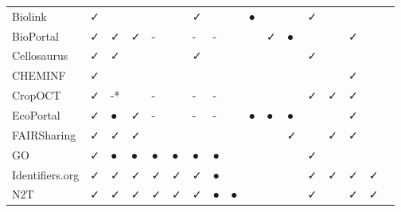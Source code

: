 \begin{table}
\begin{tabular}{lllllllllllllllll}
        Biolink &              ✓ &          &       &            &            &        ✓ &                &               &       ● &         &         &                          ✓ &        &                 &          &        \\
      BioPortal &              ✓ &        ✓ &     ✓ &          - &            &        - &              - &               &         &       ✓ &       ● &                            &        &               ✓ &          &        \\
    Cellosaurus &              ✓ &        ✓ &       &            &            &        ✓ &                &               &         &         &         &                          ✓ &        &                 &          &        \\
        CHEMINF &              ✓ &          &       &            &            &          &                &               &         &         &         &                            &        &               ✓ &          &        \\
        CropOCT &              ✓ &       -* &       &          - &            &        - &              - &               &         &         &         &                          ✓ &      ✓ &               ✓ &          &        \\
      EcoPortal &              ✓ &        ● &     ✓ &          - &            &        - &              - &               &       ● &       ● &       ● &                            &        &               ✓ &          &        \\
    FAIRSharing &              ✓ &        ✓ &     ✓ &            &            &          &                &               &         &         &       ✓ &                            &      ✓ &               ✓ &          &        \\
             GO &              ✓ &        ● &     ● &          ● &          ● &        ● &              ● &               &         &         &         &                          ✓ &        &                 &          &        \\
Identifiers.org &              ✓ &        ✓ &     ✓ &          ✓ &          ✓ &        ✓ &              ● &               &         &         &         &                          ✓ &      ✓ &               ✓ &        ✓ &        \\
            N2T &              ✓ &        ✓ &     ✓ &          ✓ &          ✓ &        ✓ &              ● &             ● &         &         &         &                          ✓ &        &               ✓ &        ✓ &        \\

\end{tabular}
\end{table}
